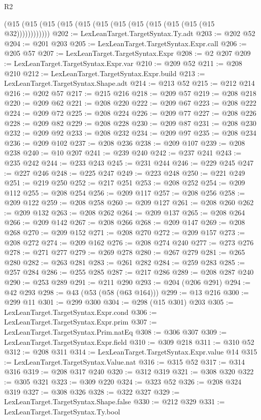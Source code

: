 \begin{lexlean}{R2}
\begin{coremodule}
    (@15 (@15 (@15 (@15 (@15 (@15 (@15 (@15 (@15 (@15 (@15 (@15 @32))))))))))))
@202 := LexLeanTarget.TargetSyntax.Ty.adt
@203 := @202 @52
@204 := @201 @203
@205 := LexLeanTarget.TargetSyntax.Expr.call
@206 := @205 @57
@207 := LexLeanTarget.TargetSyntax.Expr
@208 := @2 @207
@209 := LexLeanTarget.TargetSyntax.Expr.var
@210 := @209 @52
@211 := @208 @210
@212 := LexLeanTarget.TargetSyntax.Expr.build
@213 := LexLeanTarget.TargetSyntax.Shape.adt
@214 := @213 @52
@215 := @212 @214
@216 := @202 @57
@217 := @215 @216
@218 := @209 @57
@219 := @208 @218
@220 := @209 @62
@221 := @208 @220
@222 := @209 @67
@223 := @208 @222
@224 := @209 @72
@225 := @208 @224
@226 := @209 @77
@227 := @208 @226
@228 := @209 @82
@229 := @208 @228
@230 := @209 @87
@231 := @208 @230
@232 := @209 @92
@233 := @208 @232
@234 := @209 @97
@235 := @208 @234
@236 := @209 @102
@237 := @208 @236
@238 := @209 @107
@239 := @208 @238
@240 := @10 @207
@241 := @239 @240
@242 := @237 @241
@243 := @235 @242
@244 := @233 @243
@245 := @231 @244
@246 := @229 @245
@247 := @227 @246
@248 := @225 @247
@249 := @223 @248
@250 := @221 @249
@251 := @219 @250
@252 := @217 @251
@253 := @208 @252
@254 := @209 @112
@255 := @208 @254
@256 := @209 @117
@257 := @208 @256
@258 := @209 @122
@259 := @208 @258
@260 := @209 @127
@261 := @208 @260
@262 := @209 @132
@263 := @208 @262
@264 := @209 @137
@265 := @208 @264
@266 := @209 @142
@267 := @208 @266
@268 := @209 @147
@269 := @208 @268
@270 := @209 @152
@271 := @208 @270
@272 := @209 @157
@273 := @208 @272
@274 := @209 @162
@276 := @208 @274 @240
@277 := @273 @276
@278 := @271 @277
@279 := @269 @278
@280 := @267 @279
@281 := @265 @280
@282 := @263 @281
@283 := @261 @282
@284 := @259 @283
@285 := @257 @284
@286 := @255 @285
@287 := @217 @286
@289 := @208 @287 @240
@290 := @253 @289
@291 := @211 @290
@293 := @204 (@206 @291)
@294 := @42 @293
@298 := @43 (@53 (@58 (@63 @164)))
@299 := @13 @216
@300 := @299 @11
@301 := @299 @300
@304 := @298 (@15 @301) @203
@305 := LexLeanTarget.TargetSyntax.Expr.cond
@306 := LexLeanTarget.TargetSyntax.Expr.prim
@307 := LexLeanTarget.TargetSyntax.Prim.natEq
@308 := @306 @307
@309 := LexLeanTarget.TargetSyntax.Expr.field
@310 := @309 @218
@311 := @310 @52
@312 := @208 @311
@314 := LexLeanTarget.TargetSyntax.Expr.value @14
@315 := LexLeanTarget.TargetSyntax.Value.nat
@316 := @315 @52
@317 := @314 @316
@319 := @208 @317 @240
@320 := @312 @319
@321 := @308 @320
@322 := @305 @321
@323 := @309 @220
@324 := @323 @52
@326 := @208 @324 @319
@327 := @308 @326
@328 := @322 @327
@329 := LexLeanTarget.TargetSyntax.Shape.false
@330 := @212 @329
@331 := LexLeanTarget.TargetSyntax.Ty.bool

\end{coremodule}
\end{lexlean}
